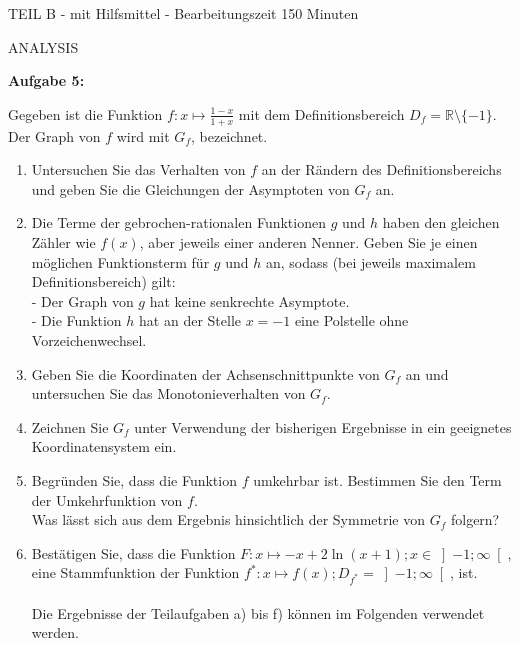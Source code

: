 \documentclass[a4paper,12pt]{article}
\newcommand{\Aufgabe}[1]{
  {
  \vspace*{0.5cm}
  \textsf{\textbf{Aufgabe #1}}
  \vspace*{0.2cm}
  
  }
}
\begin{document}
\vspace {0,5cm}


\newpage


\begin{center}
\vspace{0,5cm} {TEIL B} - mit Hilfsmittel - Bearbeitungszeit 150 Minuten
\end{center}
\vspace {0,2cm}


\vspace {1,5cm}
ANALYSIS

\Aufgabe{5:}
Gegeben ist die Funktion $f: x\mapsto \frac{1-x}{1+x}$ mit dem Definitionsbereich $D_f = \mathbb{R}\setminus\{-1\}$. Der Graph von $f$ wird mit $G_f$, bezeichnet.

\begin{enumerate}[label={\alph*)}]
  \item Untersuchen Sie das Verhalten von $f$ an der Rändern des Definitionsbereichs und geben Sie die Gleichungen der Asymptoten von $G_f$ an.
  \item Die Terme der gebrochen-rationalen Funktionen $g$ und $h$ haben den gleichen Zähler wie $f(x)$, aber jeweils einer anderen Nenner. Geben Sie je einen möglichen Funktionsterm für $g$ und $h$ an, sodass (bei jeweils maximalem Definitionsbereich) gilt:\\
  - Der Graph von $g$ hat keine senkrechte Asymptote.\\
  - Die Funktion $h$ hat an der Stelle $x = -1$ eine Polstelle ohne Vorzeichenwechsel.
  \item Geben Sie die Koordinaten der Achsenschnittpunkte von $G_f$ an und untersuchen Sie das Monotonieverhalten von $G_f$. 
  \item Zeichnen Sie $G_f$ unter Verwendung der bisherigen Ergebnisse in ein geeignetes Koordinatensystem ein.

  \item Begründen Sie, dass die Funktion $f$ umkehrbar ist. Bestimmen Sie den Term der Umkehrfunktion von $f$.\\
  Was lässt sich aus dem Ergebnis hinsichtlich der Symmetrie von $G_f$ folgern?

\item Bestätigen Sie, dass die Funktion $F: x\mapsto -x+2 \ln (x + 1); x \in \left]-1; \infty \right[$, eine Stammfunktion der Funktion $f^*: x\mapsto f(x); D_{f^*}= \left]-1; \infty \right[$, ist. 
\\
\\
\newpage
    Die Ergebnisse der Teilaufgaben a) bis f) können im Folgenden verwendet werden.\\
\\


\end{enumerate}
\end{document}
